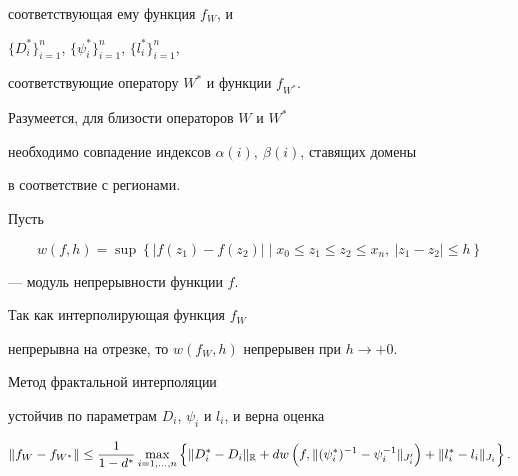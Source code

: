 соответствующая ему функция $ f_W $, и


$\{D_i^*\}_{i=1}^n$, $\{\psi_i^*\}_{i=1}^n$, $\{l_i^*\}_{i=1}^n$,


соответствующие оператору $W^*$ и функции $f_{W^*}$.


Разумеется, для близости операторов $W$ и $W^*$


необходимо совпадение индексов $\alpha(i),\ \beta(i)$, ставящих домены


в соответствие с регионами.





Пусть


$$


w (f,h) = \displaystyle


\sup \left\{ | f(z_1)-f(z_2)| \mid


x_0 \le z_1 \le z_2 \le x_n, \ |z_1-z_2| \le h \right\}


$$


--- модуль непрерывности функции $f$.


Так как интерполирующая функция $f_W$


непрерывна на отрезке, то $w(f_W,h)$ непрерывен при $ h \to + 0 $.





\begin{prop} \label{ust_par}


Метод фрактальной интерполяции


устойчив по параметрам $D_i$, $\psi_i$ и $l_i$, и верна оценка


$$


\|f_W -f_{W^*}\| \le \frac{1}{1-d^*}


\max_{i=1,\dotsc,n}


\left\{


\| D_i^* - D_i \|_{\R} +


d w \left(f,\| (\psi_i^*)^{-1} - \psi_i^{-1} \|_{J_i'}\right) +


\| l_i^* - l_i \|_{J_i}


\right \}. $$


\end{prop}





